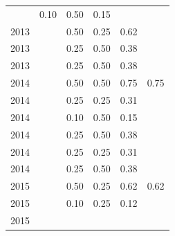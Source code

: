 \begin{table}[H]
\begin{tabular}{| l | c | c | c | c | c |}
          &
          0.10
          &
          0.50
          &
          0.15
          &
          \\
            2013
          &
          
          &
          0.50
          &
          0.25
          &
          0.62
          &
          \\
            2013
          &
          
          &
          0.25
          &
          0.50
          &
          0.38
          &
          \\
            2013
          &
          
          &
          0.25
          &
          0.50
          &
          0.38
          &
          \\
\hline
            2014
          &
          
          &
          0.50
          &
          0.50
          &
          0.75
          &
            {\color{blue} 0.75}
          \\
            2014
          &
          
          &
          0.25
          &
          0.25
          &
          0.31
          &
          \\
            2014
          &
          
          &
          0.10
          &
          0.50
          &
          0.15
          &
          \\
            2014
          &
          
          &
          0.25
          &
          0.50
          &
          0.38
          &
          \\
            2014
          &
          
          &
          0.25
          &
          0.25
          &
          0.31
          &
          \\
            2014
          &
          
          &
          0.25
          &
          0.50
          &
          0.38
          &
          \\
\hline
            2015
          &
          
          &
          0.50
          &
          0.25
          &
          0.62
          &
            {\color{blue} 0.62}
          \\
            2015
          &
          
          &
          0.10
          &
          0.25
          &
          0.12
          &
          \\
            2015
          &
          

\end{tabular}
\end{table}
